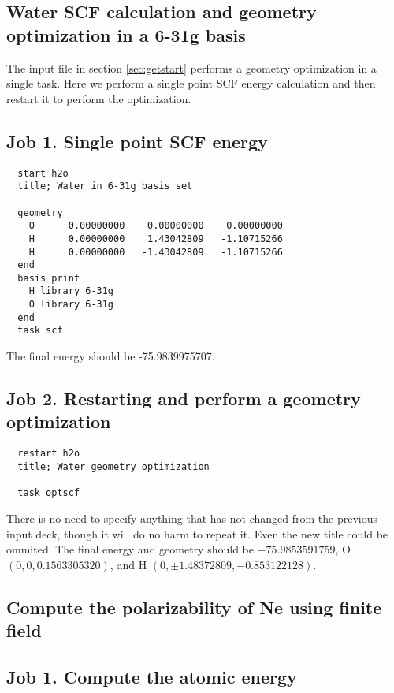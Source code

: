 \label{sec:sample}
\subsection{Water SCF calculation and geometry optimization in a 6-31g basis}

The input file in section \ref{sec:getstart} performs a geometry optimization
in a single task.  Here we perform a single point SCF energy calculation and then
restart it to perform the optimization.

\subsection{Job 1.  Single point SCF energy}

\begin{verbatim}
  start h2o
  title; Water in 6-31g basis set

  geometry
    O      0.00000000    0.00000000    0.00000000
    H      0.00000000    1.43042809   -1.10715266
    H      0.00000000   -1.43042809   -1.10715266
  end
  basis print
    H library 6-31g
    O library 6-31g
  end
  task scf
\end{verbatim}

The final energy should be -75.9839975707.

\subsection{Job 2. Restarting and perform a geometry optimization}

\begin{verbatim}
  restart h2o
  title; Water geometry optimization

  task optscf
\end{verbatim}

There is no need to specify anything that has not changed from the
previous input deck, though it will do no harm to repeat it.  Even the
new title could be ommited.  The final energy and geometry should be
$-75.9853591759$, O $(0,0,0.1563305320)$, and H $(0, \pm1.48372809,
-0.853122128)$.

\subsection{Compute the polarizability of Ne using finite field}

\subsection{Job 1. Compute the atomic energy}

